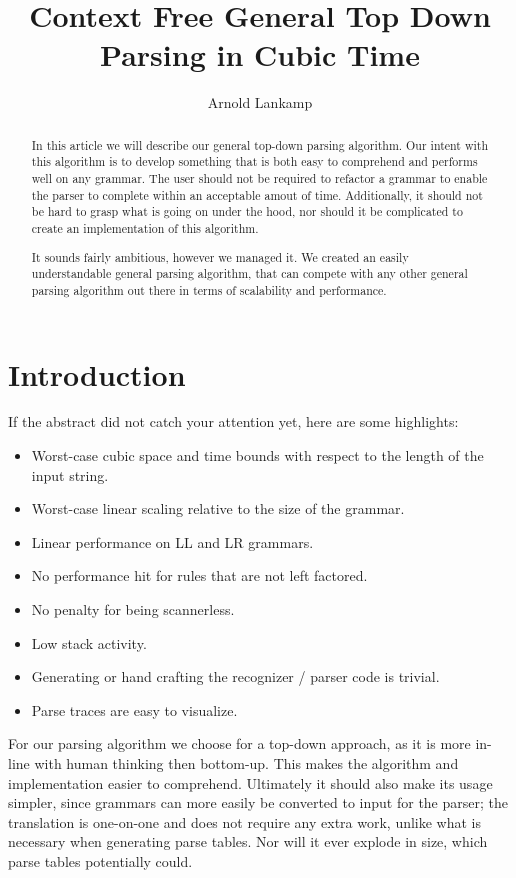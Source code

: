 \documentclass[a4paper,10pt]{article}
\title{Context Free General Top Down Parsing in Cubic Time}
\author{Arnold Lankamp}
\begin{document}
\maketitle

\begin{abstract}

In this article we will describe our general top-down parsing algorithm. Our intent with this algorithm is to develop something that is both easy to comprehend and performs well on any grammar. The user should not be required to refactor a grammar to enable the parser to complete within an acceptable amout of time. Additionally, it should not be hard to grasp what is going on under the hood, nor should it be complicated to create an implementation of this algorithm.

It sounds fairly ambitious, however we managed it. We created an easily understandable general parsing algorithm, that can compete with any other general parsing algorithm out there in terms of scalability and performance.

\end{abstract}

\section{Introduction}

If the abstract did not catch your attention yet, here are some highlights:
\begin{itemize}
 \setlength{\itemsep}{0pt}
 \setlength{\parskip}{0pt}
 \setlength{\parsep}{0pt}
 
 \item Worst-case cubic space and time bounds with respect to the length of the input string.
 \item Worst-case linear scaling relative to the size of the grammar.
 \item Linear performance on LL and LR grammars.
 \item No performance hit for rules that are not left factored.
 \item No penalty for being scannerless.
 \item Low stack activity.
 \item Generating or hand crafting the recognizer / parser code is trivial.
 \item Parse traces are easy to visualize.
\end{itemize}

For our parsing algorithm we choose for a top-down approach, as it is more in-line with human thinking then bottom-up. This makes the algorithm and implementation easier to comprehend. Ultimately it should also make its usage simpler, since grammars can more easily be converted to input for the parser; the translation is one-on-one and does not require any extra work, unlike what is necessary when generating parse tables. Nor will it ever explode in size, which parse tables potentially could.
\end{document}
